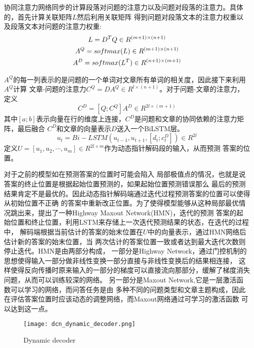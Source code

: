 协同注意力网络同步的计算段落对问题的注意力以及问题对段落的注意力。具体的，首先计算关联矩阵$L$然后利用关联矩阵
得到问题对段落文本的注意力权重以及段落文本对问题的注意力权重:
\begin{gather}
    L=D^{T}Q\in R^{(m+1)\times(n+1)} \notag \\
    A^Q=softmax(L)\in R^{(m+1)\times(n+1)} \notag \\
    A^D=softmax(L^T)\in R^{(n+1)\times(m+1)} \notag 
\end{gather}

$A^Q$的每一列表示的是问题的一个单词对文章所有单词的相关度，因此接下来利用$A^Q$计算
文章-问题的注意力$C^Q=DA^Q\in R^{l\times(n+1)}$。对于问题-文章的注意力，定义
$$
C^D=[Q;C^Q]A^D\in R^{2l\times(m+1)}
$$
其中$[a;b]$表示向量在行的维度上连接，$C^D$是问题和文章的协同依赖的注意力矩阵，最后融合
$C^D$和文章的向量表示$D$送入一个BiLSTM层。
$$
u_t=Bi-LSTM(u_{t-1},u_{t+1},[d_t;c_t^D])\in R^{2l}
$$
定义$U=[u_1,u_2,\cdots,u_m]\in R^{2l\times m}$作为动态指针解码段的输入，从而预测
答案的位置。

对于之前的模型如在预测答案的位置时可能会陷入
局部极值点的情况，也就是说答案的终止位置是根据起始位置预测的，如果起始位置预测错误那么
最后的预测结果肯定不是最优的。因此动态指针解码端通过迭代过程预测答案的位置可以使得从初始位置不正确
的答案中重新改正位置。为了使得模型能够从这种局部最优情况跳出来，提出了一种Highway Maxout Network(HMN)，迭代的预测
答案的起始位置和终止位置，利用LSTM来存储上一次迭代预测结果的状态，在迭代的过程中，
解码端根据当前估计的答案的始末位置在$U$中的向量表示，通过HMN网络后估计新的答案的始末位置，当
两次估计的答案位置一致或者达到最大迭代次数则停止迭代。HMN是由两部分构成，
一部分是Highway Network，通过门控机制的思想使得输入一部分做非线性变换一部分直接与非线性变换后的结果相连接，
这样使得反向传播时原来输入的一部分的梯度可以直接流向那部分，缓解了梯度消失问题，从而可以训练较深的网络。
另一部分是Maxout Network,它是一层激活函数可以学习的网络，而问答任务是由
多种不同的问题类型和文章主题构成，因此在评估答案位置时应该动态的调整网络，而Maxout网络通过可学习的激活函数
可以达到这一点。

\begin{figure}
    \centering
    \texttt{[image: dcn\_dynamic\_decoder.png]}
    \caption{Dynamic decoder}
\end{figure}

